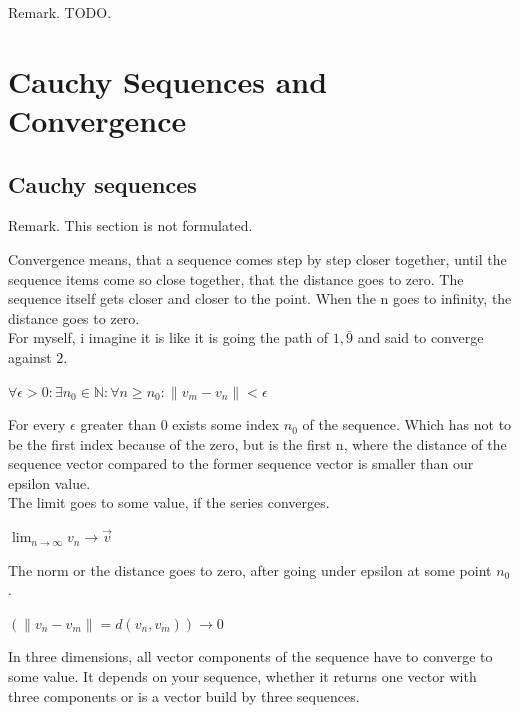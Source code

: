\documentclass[a4paper]{article}
\begin{document}
\begin{Example}
Remark. TODO.

\section{Cauchy Sequences and Convergence}
\subsection{Cauchy sequences}

Remark. This section is not formulated.

Convergence means, that a sequence comes step by step closer together, until the sequence items come so close together, that the distance goes to zero. The sequence itself gets closer and closer to the point. When the n goes to infinity, the distance goes to zero.\\

For myself, i imagine it is like it is going the path of $1,\bar{9}$ and said to converge against $2$.\\

\begin{center}
$\forall \epsilon > 0 : \exists n_{0} \in \mathbb{N} : \forall n \geq n_{0} : \|v_{m}-v_{n}\| < \epsilon$
\end{center}

For every $\epsilon$ greater than 0 exists some index $n_{0}$ of the sequence. Which has not to be the first index because of the zero,
but is the first n, where the distance of the sequence vector compared to the former sequence vector is smaller than our epsilon value.\\

The limit goes to some value, if the series converges.\\

\begin{center}
$\lim\nolimits_{n\rightarrow\infty} v_{n} \rightarrow \vec{v}$\\
\end{center}

The norm or the distance goes to zero, after going under epsilon at some point $n_{0}$.

\begin{center}
$(\|v_{n}-v_{m}\| = d(v_{n},v_{m})) \rightarrow 0$
\end{center}


In three dimensions, all vector components of the sequence have to converge to some value. It depends on your sequence, whether it returns one vector with three components or is a vector build by three sequences.\\


\end{Example}
\end{document}
